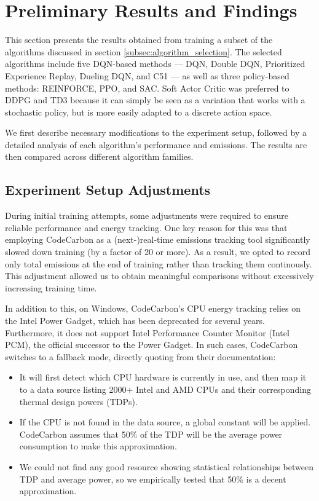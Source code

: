 \section{Preliminary Results and Findings}
\label{sec:preliminary_results}

This section presents the results obtained from training a subset of the algorithms discussed in section \ref{subsec:algorithm_selection}. The selected algorithms include five DQN-based methods — DQN, Double DQN, Prioritized Experience Replay, Dueling DQN, and C51 — as well as three policy-based methods: REINFORCE, PPO, and SAC. Soft Actor Critic was preferred to DDPG and TD3 because it can simply be seen as a variation that works with a stochastic policy, but is more easily adapted to a discrete action space.

We first describe necessary modifications to the experiment setup, followed by a detailed analysis of each algorithm's performance and emissions. The results are then compared across different algorithm families.

\subsection{Experiment Setup Adjustments}
\label{subsec:exp_setup_adjustments}
During initial training attempts, some adjustments were required to ensure reliable performance and energy tracking. One key reason for this was that employing CodeCarbon as a (next-)real-time emissions tracking tool significantly slowed down training (by a factor of 20 or more). As a result, we opted to record only total emissions at the end of training rather than tracking them continously. This adjustment allowed us to obtain meaningful comparisons without excessively increasing training time.

In addition to this, on Windows, CodeCarbon's CPU energy tracking relies on the Intel Power Gadget, which has been deprecated for several years. Furthermore, it does not support Intel Performance Counter Monitor (Intel PCM), the official successor to the Power Gadget. In such cases, CodeCarbon switches to a fallback mode, directly quoting from their documentation:
\begin{quoting}
	\begin{itemize}
		\item It will first detect which CPU hardware is currently in use, and then map it to a data source listing 2000+ Intel and AMD CPUs and their corresponding thermal design powers (TDPs).
		
		\item If the CPU is not found in the data source, a global constant will be applied. CodeCarbon assumes that 50\% of the TDP will be the average power consumption to make this approximation.
		
		\item We could not find any good resource showing statistical relationships between TDP and average power, so we empirically tested that 50\% is a decent approximation.
	\end{itemize}
\end{quoting}

